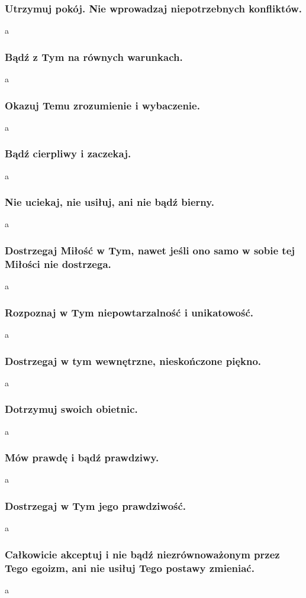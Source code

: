 \subsubsection{Utrzymuj pokój. Nie wprowadzaj niepotrzebnych konfliktów.}
a 
\subsubsection{Bądź z Tym na równych warunkach.}
a 
\subsubsection{Okazuj Temu zrozumienie i wybaczenie.}
a 
\subsubsection{Bądź cierpliwy i zaczekaj.}
a 
\subsubsection{Nie uciekaj, nie usiłuj, ani nie bądź bierny.}
a 
\subsubsection{Dostrzegaj Miłość w Tym, nawet jeśli ono samo w sobie tej Miłości nie dostrzega.}
a 
\subsubsection{Rozpoznaj w Tym niepowtarzalność i unikatowość.}
a 
\subsubsection{Dostrzegaj w tym wewnętrzne, nieskończone piękno.}
a 
\subsubsection{Dotrzymuj swoich obietnic.}
a 
\subsubsection{Mów prawdę i bądź prawdziwy.}
a 
\subsubsection{Dostrzegaj w Tym jego prawdziwość.}
a 
\subsubsection{Całkowicie akceptuj i nie bądź niezrównoważonym przez Tego egoizm, ani nie usiłuj Tego postawy zmieniać.}
a 
